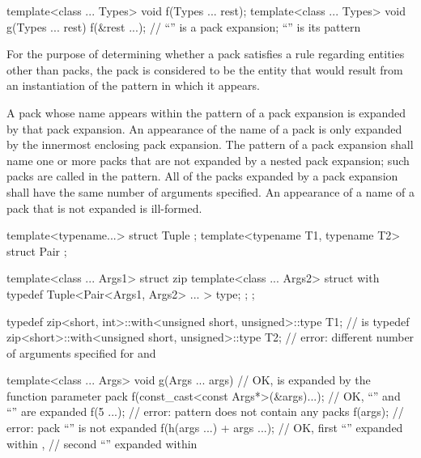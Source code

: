 \begin{example}
\begin{codeblock}
template<class ... Types> void f(Types ... rest);
template<class ... Types> void g(Types ... rest) {
  f(&rest ...);     // ``'' is a pack expansion; ``'' is its pattern
}
\end{codeblock}
\end{example}

\pnum
For the purpose of determining whether a pack satisfies a rule
regarding entities other than packs, the pack is
considered to be the entity that would result from an instantiation of
the pattern in which it appears.

\pnum
A pack whose name appears within the pattern of a pack
expansion is expanded by that pack expansion. An appearance of the name of
a pack is only expanded by the innermost enclosing pack expansion.
The pattern of a pack expansion shall name one or more packs that
are not expanded by a nested pack expansion; such packs are called
 in the pattern. All of the packs expanded
by a pack expansion shall have the same number of arguments specified. An
appearance of a name of a pack that is not expanded is
ill-formed.
\begin{example}
\begin{codeblock}
template<typename...> struct Tuple {};
template<typename T1, typename T2> struct Pair {};

template<class ... Args1> struct zip {
  template<class ... Args2> struct with {
    typedef Tuple<Pair<Args1, Args2> ... > type;
  };
};

typedef zip<short, int>::with<unsigned short, unsigned>::type T1;
    //  is 
typedef zip<short>::with<unsigned short, unsigned>::type T2;
    // error: different number of arguments specified for  and 

template<class ... Args>
  void g(Args ... args) {                   // OK,  is expanded by the function parameter pack 
    f(const_cast<const Args*>(&args)...);   // OK, ``'' and ``'' are expanded
    f(5 ...);                               // error: pattern does not contain any packs
    f(args);                                // error: pack ``'' is not expanded
    f(h(args ...) + args ...);              // OK, first ``'' expanded within ,
                                            // second ``'' expanded within 
  }
\end{codeblock}
\end{example}

